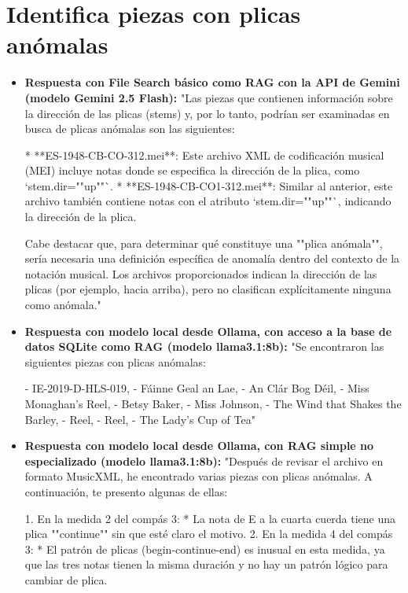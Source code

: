 \begin{itemize}
\end{itemize}

\section{Identifica piezas con plicas anómalas}
\begin{itemize}
    \item \textbf{Respuesta con File Search básico como RAG con la API de Gemini (modelo Gemini 2.5 Flash):} "Las piezas que contienen información sobre la dirección de las plicas (stems) y, por lo tanto, podrían ser examinadas en busca de plicas anómalas son las siguientes:

*   **ES-1948-CB-CO-312.mei**: Este archivo XML de codificación musical (MEI) incluye notas donde se especifica la dirección de la plica, como `stem.dir=""up""`.
*   **ES-1948-CB-CO1-312.mei**: Similar al anterior, este archivo también contiene notas con el atributo `stem.dir=""up""`, indicando la dirección de la plica.

Cabe destacar que, para determinar qué constituye una ""plica anómala"", sería necesaria una definición específica de anomalía dentro del contexto de la notación musical. Los archivos proporcionados indican la dirección de las plicas (por ejemplo, hacia arriba), pero no clasifican explícitamente ninguna como anómala."
    \item \textbf{Respuesta con modelo local desde Ollama, con acceso a la base de datos SQLite como RAG (modelo llama3.1:8b):} "Se encontraron las siguientes piezas con plicas anómalas:

- IE-2019-D-HLS-019,
- Fáinne Geal an Lae,
- An Clár Bog Déil,
- Miss Monaghan’s Reel,
- Betsy Baker,
- Miss Johnson,
- The Wind that Shakes the Barley,
- Reel,
- Reel,
- The Lady’s Cup of Tea"
\item \textbf{Respuesta con modelo local desde Ollama, con RAG simple no especializado (modelo llama3.1:8b):} "Después de revisar el archivo en formato MusicXML, he encontrado varias piezas con plicas anómalas. A continuación, te presento algunas de ellas:

1. En la medida 2 del compás 3:
 * La nota de E a la cuarta cuerda tiene una plica ""continue"" sin que esté claro el motivo.
2. En la medida 4 del compás 3:
 * El patrón de plicas (begin-continue-end) es inusual en esta medida, ya que las tres notas tienen la misma duración y no hay un patrón lógico para cambiar de plica.


\end{itemize}
